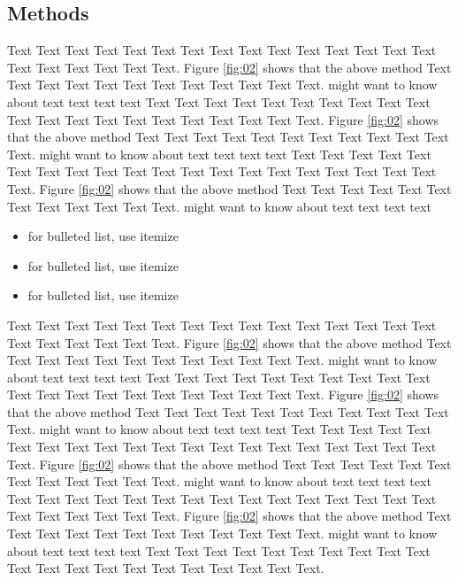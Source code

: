 \documentclass{bioinfo}
\begin{document}
\begin{methods}
\section{Methods}

Text Text Text Text Text Text  Text Text Text Text Text Text Text Text Text  Text Text Text Text Text Text. Figure \ref{fig:02} shows that the above method  Text Text Text Text  Text Text Text Text Text Text  Text Text.  \citealp{shortread} might want to know about  text text text text
Text Text Text Text Text Text  Text Text Text Text Text Text Text Text Text  Text Text Text Text Text Text. Figure \ref{fig:02} shows that the above method  Text Text Text Text  Text Text Text Text Text Text  Text Text.  \citealp{shortread} might want to know about  text text text text
Text Text Text Text Text Text  Text Text Text Text Text Text Text Text Text  Text Text Text Text Text Text. Figure \ref{fig:02} shows that the above method  Text Text Text Text  Text Text Text Text Text Text  Text Text.  \citealp{shortread} might want to know about  text text text text

\begin{itemize}
\item for bulleted list, use itemize
\item for bulleted list, use itemize
\item for bulleted list, use itemize
\end{itemize}



Text Text Text Text Text Text  Text Text Text Text Text Text Text Text Text  Text Text Text Text Text Text. Figure \ref{fig:02} shows that the above method  Text Text Text Text  Text Text Text Text Text Text  Text Text.  \citealp{shortread} might want to know about  text text text text
Text Text Text Text Text Text  Text Text Text Text Text Text Text Text Text  Text Text Text Text Text Text. Figure \ref{fig:02} shows that the above method  Text Text Text Text  Text Text Text Text Text Text  Text Text.  \citealp{shortread} might want to know about  text text text text
Text Text Text Text Text Text  Text Text Text Text Text Text Text Text Text  Text Text Text Text Text Text. Figure \ref{fig:02} shows that the above method  Text Text Text Text  Text Text Text Text Text Text  Text Text.  \citealp{shortread} might want to know about  text text text text
Text Text Text Text Text Text  Text Text Text Text Text Text Text Text Text  Text Text Text Text Text Text. Figure \ref{fig:02} shows that the above method  Text Text Text Text  Text Text Text Text Text Text  Text Text.  \citealp{shortread} might want to know about  text text text text
Text Text Text Text Text Text  Text Text Text Text Text Text Text Text Text  Text Text Text Text Text Text.



\end{methods}
\end{document}
